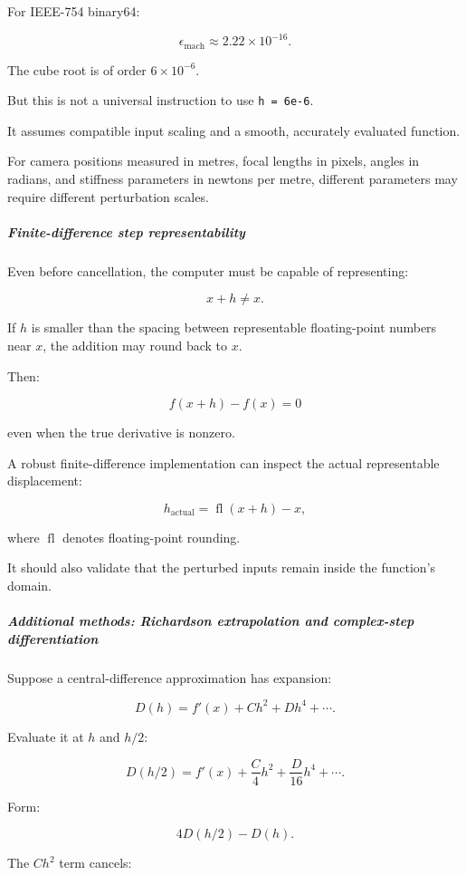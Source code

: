 For IEEE-754 binary64:

\[
\epsilon_{\mathrm{mach}} \approx2.22\times10^{-16}.
\]

The cube root is of order \(6\times10^{-6}\).

But this is not a universal instruction to use \texttt{h\ =\ 6e-6}.

It assumes compatible input scaling and a smooth, accurately evaluated function.

For camera positions measured in metres, focal lengths in pixels, angles in radians, and stiffness parameters in newtons per metre, different parameters may require different perturbation scales.

\subparagraph{Finite-difference step representability}\label{02-foundations-ii-ch025-finite-difference-step-representability}

Even before cancellation, the computer must be capable of representing:

\[
x+h\ne x.
\]

If \(h\) is smaller than the spacing between representable floating-point numbers near \(x\), the addition may round back to \(x\).

Then:

\[
f(x+h)-f(x)=0
\]

even when the true derivative is nonzero.

A robust finite-difference implementation can inspect the actual representable displacement:

\[
h_{\mathrm{actual}}=\operatorname{fl}(x+h)-x,
\]

where \(\operatorname{fl}\) denotes floating-point rounding.

It should also validate that the perturbed inputs remain inside the function's domain.

\subparagraph{Additional methods: Richardson extrapolation and complex-step differentiation}\label{02-foundations-ii-ch025-additional-methods-richardson-extrapolation-and-complex-step-differentiation}

Suppose a central-difference approximation has expansion:

\[
D(h)=f'(x)+Ch^2+Dh^4+\cdots.
\]

Evaluate it at \(h\) and \(h/2\):

\[
D(h/2)=f'(x)+\frac C4h^2+\frac D{16}h^4+\cdots.
\]

Form:

\[
4D(h/2)-D(h).
\]

The \(Ch^2\) term cancels:

